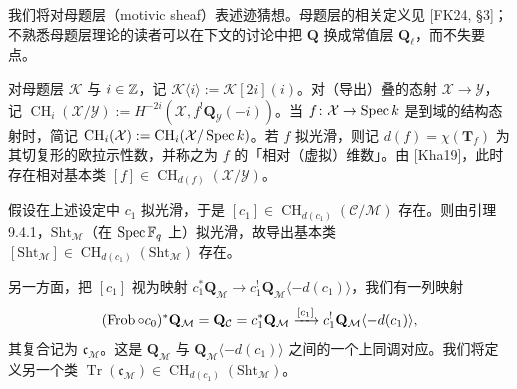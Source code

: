 我们将对母题层（motivic sheaf）表述迹猜想。母题层的相关定义见 [FK24, §3]；不熟悉母题层理论的读者可以在下文的讨论中把 $\mathbf Q$ 换成常值层 $\mathbf Q_\ell$，而不失要点。

对母题层 $\mathcal K$ 与 $i\in\mathbb{Z}$，记 $\mathcal K\langle i\rangle:=\mathcal K[2i](i)$。对（导出）叠的态射 $\mathcal X\to\mathcal Y$，记 $\operatorname{CH}_i(\mathcal X/\mathcal Y):=H^{-2i}(\mathcal X,f^!\mathbf Q_{\mathcal Y}(-i))$。当 $f\colon\mathcal X\to\operatorname{Spec} k$ 是到域的结构态射时，简记 $\operatorname{CH}_i(\mathcal X):=\operatorname{CH}_i(\mathcal X/\operatorname{Spec} k)$。若 $f$ 拟光滑，则记 $d(f)=\chi(\mathbf T_f)$ 为其切复形的欧拉示性数，并称之为 $f$ 的「相对（虚拟）维数」。由 [Kha19]，此时存在相对基本类 $[f]\in\operatorname{CH}_{d(f)}(\mathcal X/\mathcal Y)$。

假设在上述设定中 $c_1$ 拟光滑，于是 $[c_1]\in\operatorname{CH}_{d(c_1)}(\mathcal C/\mathcal M)$ 存在。则由引理 9.4.1，$\mathrm{Sht}_{\mathcal M}$（在 $\operatorname{Spec}\mathbb{F}_q$ 上）拟光滑，故导出基本类 $[\mathrm{Sht}_{\mathcal M}]\in\operatorname{CH}_{d(c_1)}(\mathrm{Sht}_{\mathcal M})$ 存在。

另一方面，把 $[c_1]$ 视为映射 $c_1^*\mathbf Q_{\mathcal M}\to c_1^!\mathbf Q_{\mathcal M}\langle-d(c_1)\rangle$，我们有一列映射
\[
(\operatorname{Frob}\circ c_0)^*\mathbf Q_{\mathcal M}=\mathbf Q_{\mathcal C}=c_1^*\mathbf Q_{\mathcal M}\xrightarrow{[c_1]}c_1^!\mathbf Q_{\mathcal M}\langle-d(c_1)\rangle,
\]
其复合记为 $\mathfrak c_{\mathcal M}$。这是 $\mathbf Q_{\mathcal M}$ 与 $\mathbf Q_{\mathcal M}\langle-d(c_1)\rangle$ 之间的一个上同调对应。我们将定义另一个类 $\operatorname{Tr}(\mathfrak c_{\mathcal M})\in\operatorname{CH}_{d(c_1)}(\mathrm{Sht}_{\mathcal M})$。

